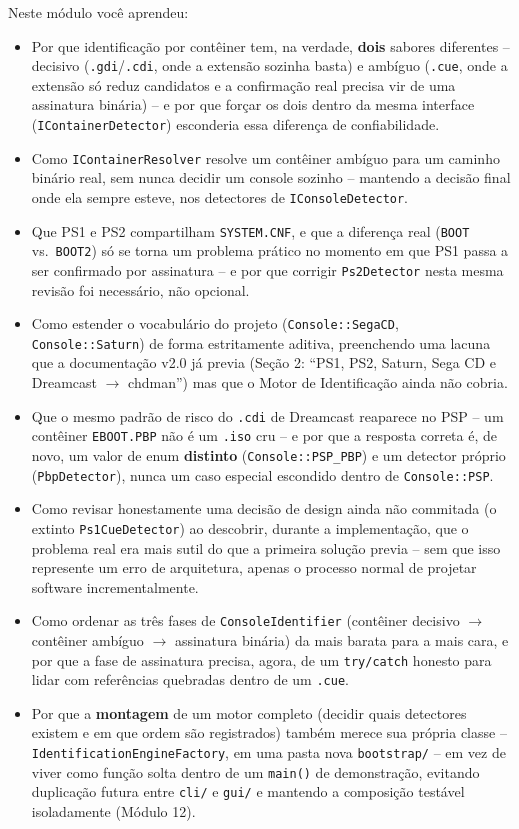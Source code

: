 \begin{CaixaResumo}
Neste módulo você aprendeu:
\begin{itemize}
    \item Por que identificação por contêiner tem, na verdade, \textbf{dois} sabores diferentes -- decisivo (\texttt{.gdi}/\texttt{.cdi}, onde a extensão sozinha basta) e ambíguo (\texttt{.cue}, onde a extensão só reduz candidatos e a confirmação real precisa vir de uma assinatura binária) -- e por que forçar os dois dentro da mesma interface (\texttt{IContainerDetector}) esconderia essa diferença de confiabilidade.
    \item Como \texttt{IContainerResolver} resolve um contêiner ambíguo para um caminho binário real, sem nunca decidir um console sozinho -- mantendo a decisão final onde ela sempre esteve, nos detectores de \texttt{IConsoleDetector}.
    \item Que PS1 e PS2 compartilham \texttt{SYSTEM.CNF}, e que a diferença real (\texttt{BOOT} vs.\ \texttt{BOOT2}) só se torna um problema prático no momento em que PS1 passa a ser confirmado por assinatura -- e por que corrigir \texttt{Ps2Detector} nesta mesma revisão foi necessário, não opcional.
    \item Como estender o vocabulário do projeto (\texttt{Console::SegaCD}, \texttt{Console::Saturn}) de forma estritamente aditiva, preenchendo uma lacuna que a documentação v2.0 já previa (Seção 2: ``PS1, PS2, Saturn, Sega CD e Dreamcast $\rightarrow$ chdman'') mas que o Motor de Identificação ainda não cobria.
    \item Que o mesmo padrão de risco do \texttt{.cdi} de Dreamcast reaparece no PSP -- um contêiner \texttt{EBOOT.PBP} não é um \texttt{.iso} cru -- e por que a resposta correta é, de novo, um valor de enum \textbf{distinto} (\texttt{Console::PSP\_PBP}) e um detector próprio (\texttt{PbpDetector}), nunca um caso especial escondido dentro de \texttt{Console::PSP}.
    \item Como revisar honestamente uma decisão de design ainda não commitada (o extinto \texttt{Ps1CueDetector}) ao descobrir, durante a implementação, que o problema real era mais sutil do que a primeira solução previa -- sem que isso represente um erro de arquitetura, apenas o processo normal de projetar software incrementalmente.
    \item Como ordenar as três fases de \texttt{ConsoleIdentifier} (contêiner decisivo $\rightarrow$ contêiner ambíguo $\rightarrow$ assinatura binária) da mais barata para a mais cara, e por que a fase de assinatura precisa, agora, de um \texttt{try/catch} honesto para lidar com referências quebradas dentro de um \texttt{.cue}.
    \item Por que a \textbf{montagem} de um motor completo (decidir quais detectores existem e em que ordem são registrados) também merece sua própria classe -- \texttt{IdentificationEngineFactory}, em uma pasta nova \texttt{bootstrap/} -- em vez de viver como função solta dentro de um \texttt{main()} de demonstração, evitando duplicação futura entre \texttt{cli/} e \texttt{gui/} e mantendo a composição testável isoladamente (Módulo 12).
\end{itemize}


\end{CaixaResumo}
